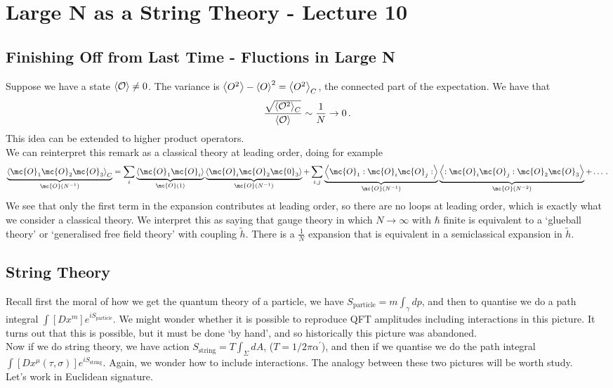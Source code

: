 \documentclass{article}
\begin{document}
\section{Large N as a String Theory - Lecture 10}
\subsection{Finishing Off from Last Time - Fluctions in Large N}
Suppose we have a state $\left\langle \mathcal{O} \right\rangle \neq 0$. The variance is $\left\langle O^2 \right\rangle-\left\langle O \right\rangle^2 = \left\langle O^2 \right\rangle_C$, the connected part of the expectation. We have that 
	\[
	\frac{\sqrt{\left\langle \mathcal{O}^2 \right\rangle_C}}{\left\langle \mathcal{O} \right\rangle} \sim \frac{1}{N} \to 0 \, . 
	\] 
This idea can be extended to higher product operators. \\
We can reinterpret this remark as a classical theory at leading order, doing for example
\begin{align*}
	\underbrace{\pangle{\mc{O}_1 \mc{O}_2 \mc{O}_3}_C}_{\mc{O}(N^{-1})} = \sum_i \underbrace{\pangle{\mc{O}_1 \mc{O}_i}}_{\mc{O}(1)}\underbrace{\pangle{\mc{O}_i \mc{O}_2 \mc{0}_3}}_{\mc{O}(N^{-1})} + \sum_{i,j} \underbrace{\pangle{\mc{O}_1 : \mc{O}_i \mc{O}_j :}}_{\mc{O}(N^{-1})} \underbrace{\pangle{:\mc{O}_i \mc{O}_j: \mc{O}_2 \mc{O}_3}}_{\mc{O}(N^{-2})} + \dots \, . 
\end{align*}
We see that only the first term in the expansion contributes at leading order, so there are no loops at leading order, which is exactly what we consider a classical theory. We interpret this as saying that gauge theory in which $N \to \infty$ with $\hbar$ finite is equivalent to a `glueball theory' or `generalised free field theory' with coupling $\tilde{h}$. There is a $\frac{1}{N}$ expansion that is equivalent in a semiclassical expansion in $\tilde{h}$.  
\subsection{String Theory}
Recall first the moral of how we get the quantum theory of a particle, we have $S_{\text{particle}} = m \int_\gamma dp$, and then to quantise we do a path integral $\int [Dx^m] e^{i S_{\text{particle}}}$. We might wonder whether it is possible to reproduce QFT amplitudes including interactions in this picture. It turns out that this is possible, but it must be done `by hand', and so historically this picture was abandoned. \\
Now if we do string theory, we have action $S_{\text{string}} = T \int_{\Sigma} dA$, ($T = 1/2\pi \alpha^\prime$), and then if we quantise we do the path integral $\int [Dx^\mu (\tau, \sigma)] e^{i S_{\text{string}}}$. Again, we wonder how to include interactions. The analogy between these two pictures will be worth study. \\
Let's work in Euclidean signature. 
\end{document}
